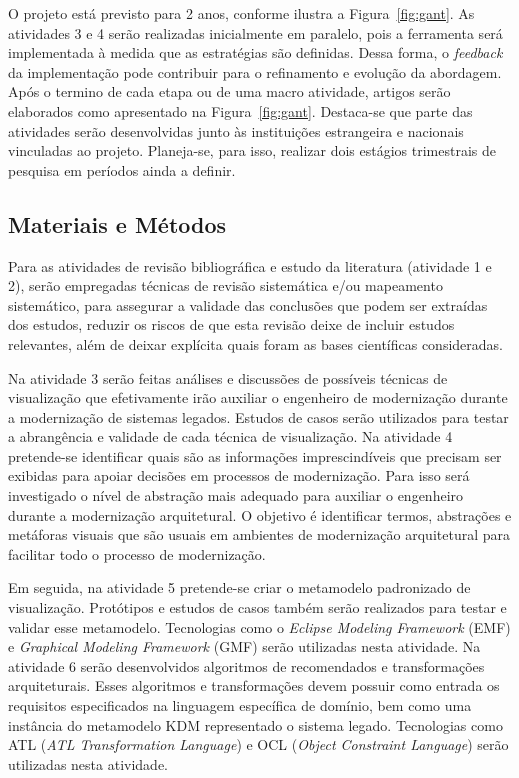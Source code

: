 \documentclass[12pt]{article}
\begin{document}
O projeto está previsto para 2 anos, conforme ilustra a Figura~\ref{fig:gant}. As atividades 3 e 4 serão realizadas inicialmente em paralelo, pois a ferramenta será implementada à medida que as estratégias são definidas. Dessa forma, o \textit{feedback} da implementação pode contribuir para o refinamento e evolução da abordagem. Após o termino de cada etapa ou de uma macro atividade, artigos serão elaborados como apresentado na Figura~\ref{fig:gant}. 
Destaca-se que parte das atividades serão desenvolvidas junto às instituições estrangeira e nacionais vinculadas ao projeto. Planeja-se, para isso, realizar dois estágios trimestrais de pesquisa em períodos ainda a definir. 

\subsection{Materiais e Métodos}

Para as atividades de revisão bibliográfica e estudo da literatura (atividade 1 e 2), serão empregadas técnicas de revisão sistemática e/ou mapeamento sistemático, para assegurar a validade das conclusões que podem ser extraídas dos estudos, reduzir os riscos de que esta revisão deixe de incluir estudos relevantes, além de deixar explícita quais foram as bases científicas consideradas.

Na atividade 3 serão feitas análises e discussões de possíveis técnicas de visualização que efetivamente irão auxiliar o engenheiro de modernização durante a modernização de sistemas legados. Estudos de casos serão utilizados para testar a abrangência e validade de cada técnica de visualização. Na atividade 4 pretende-se identificar quais são as informações imprescindíveis que precisam ser exibidas para apoiar decisões em processos de modernização. Para isso será investigado o nível de abstração mais adequado para auxiliar o engenheiro durante a modernização arquitetural. O objetivo é identificar termos, abstrações e metáforas visuais que são usuais em ambientes de modernização arquitetural para facilitar todo o processo de modernização.

Em seguida, na atividade 5 pretende-se criar o metamodelo padronizado de visualização. Protótipos e estudos de casos também serão realizados para testar e validar esse metamodelo. Tecnologias como o \textit{Eclipse Modeling Framework} (EMF) e \textit{Graphical Modeling Framework} (GMF) serão utilizadas nesta atividade. Na atividade 6 serão desenvolvidos algoritmos de recomendados e transformações arquiteturais. Esses algoritmos e transformações devem possuir como entrada os requisitos especificados na linguagem específica de domínio, bem como uma instância do metamodelo KDM representado o sistema legado. Tecnologias como ATL (\textit{ATL Transformation Language}) e OCL (\textit{Object Constraint Language}) serão utilizadas nesta atividade. 
\end{document}
